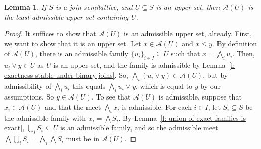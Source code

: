 \documentclass[11pt,a4paper,reqno]{amsart}
\newcommand{\tbigwedge}{\mathop{\textstyle \bigwedge }}%
\newtheorem{lemma}[theorem]{Lemma}
\theoremstyle{definition}
\theoremstyle{remark}
\newcommand{\ca}[1]{\mathcal{#1}}
\newcommand{\se}{\subseteq}
\begin{document}
{\begin{lemma}\label{l: only one step needed for exact closure}
    If $S$ is a join-semilattice, and $U\se S$ is an upper set, then $\ca{A}(U)$ is the least admissible upper set containing $U$.
\end{lemma}
\begin{proof}
It suffices to show that $\ca{A}(U)$ is an admissible upper set, already. First, we want to show that it is an upper set. Let $x\in \ca{A}(U)$ and $x\leq y$. By definition of $\ca{A}(U)$, there is an admissible family $\{u_i\}_{i\in I}\subseteq U$ such that $x=\tbigwedge_i u_i$. Then, $u_i\vee y\in U$ as $U$ is an upper set, and the family is admissible by Lemma~\ref{l: exactness stable under binary joins}. So, $\tbigwedge_i (u_i\vee y)\in \ca{A}(U)$, but by admissibility of $\tbigwedge_i u_i$ this equals $\tbigwedge_i u_i\vee y$, which is equal to $y$ by our assumptions. So $y\in \ca{A}(U)$. To see that $\ca{A}(U)$ is admissible, suppose that $x_i\in \ca{A}(U)$ and that the meet $\tbigwedge_i x_i$ is admissible. For each $i\in I$, let $S_i\se S$ be the admissible family with $x_i=\tbigwedge S_i$. By Lemma~\ref{l: union of exact families is exact}, $\bigcup_i S_i\se U$ is an admissible family, and so the admissible meet $\tbigwedge \bigcup_i S_i=\tbigwedge_i \tbigwedge S_i$ must be in $\ca{A}(U)$.
\end{proof}

}
\end{document}
